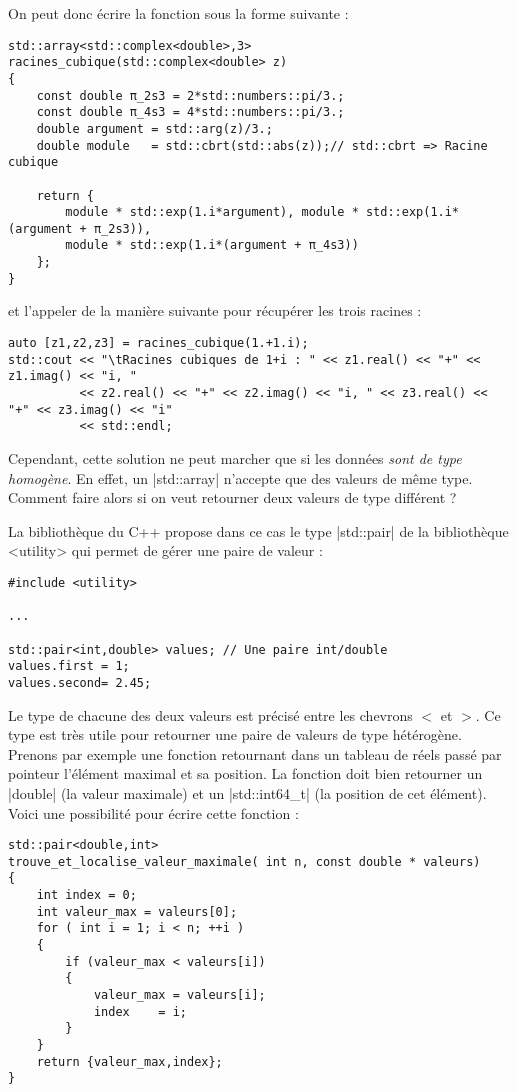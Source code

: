 \begin{itemize}
On peut donc écrire la fonction sous la forme suivante :

\begin{lstlisting}
std::array<std::complex<double>,3> racines_cubique(std::complex<double> z)
{
    const double π_2s3 = 2*std::numbers::pi/3.;
    const double π_4s3 = 4*std::numbers::pi/3.;
    double argument = std::arg(z)/3.;
    double module   = std::cbrt(std::abs(z));// std::cbrt => Racine cubique

    return {
        module * std::exp(1.i*argument), module * std::exp(1.i*(argument + π_2s3)),
        module * std::exp(1.i*(argument + π_4s3))
    };
}
\end{lstlisting}

et l'appeler de la manière suivante pour récupérer les trois racines :
\begin{lstlisting}
auto [z1,z2,z3] = racines_cubique(1.+1.i);
std::cout << "\tRacines cubiques de 1+i : " << z1.real() << "+" << z1.imag() << "i, "
          << z2.real() << "+" << z2.imag() << "i, " << z3.real() << "+" << z3.imag() << "i"
          << std::endl;
\end{lstlisting}

Cependant, cette solution ne peut marcher que si les données \textsl{sont de type homogène}. En effet,
un |std::array| n'accepte que des valeurs de même type. Comment faire alors si on veut retourner deux
valeurs de type différent ?

La bibliothèque du C++ propose dans ce cas le type |std::pair| de la bibliothèque <utility> qui permet
de gérer une paire de valeur :
\begin{lstlisting}
#include <utility>

...

std::pair<int,double> values; // Une paire int/double
values.first = 1;
values.second= 2.45;
\end{lstlisting}

Le type de chacune des deux valeurs est précisé entre les chevrons $<$ et $>$. Ce type est très utile
pour retourner une paire de valeurs de type hétérogène. Prenons par exemple une fonction retournant
dans un tableau de réels passé par pointeur l'élément maximal et sa position. La fonction doit
bien retourner un |double| (la valeur maximale) et un |std::int64_t| (la position de cet élément).
Voici une possibilité pour écrire cette fonction :
\begin{lstlisting}
std::pair<double,int> 
trouve_et_localise_valeur_maximale( int n, const double * valeurs)
{
    int index = 0;
    int valeur_max = valeurs[0];
    for ( int i = 1; i < n; ++i )
    {
        if (valeur_max < valeurs[i])
        {
            valeur_max = valeurs[i];
            index    = i;
        }
    }
    return {valeur_max,index};
}
\end{lstlisting}


\end{itemize}
